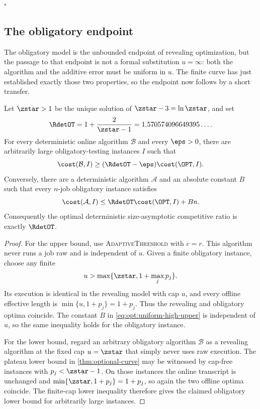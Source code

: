 \hfill$\square$

\subsection{The obligatory endpoint}
\label{sec:obligatory}

The obligatory model is the unbounded endpoint of revealing optimization,
but the passage to that endpoint is not a formal substitution
$u=\infty$: both the algorithm and the additive error must be uniform in
$u$.  The finite curve has just established exactly those two properties,
so the endpoint now follows by a short transfer.

\begin{theorem}
\label{thm:det-obligatory}
Let $\zstar>1$ be the unique solution of
$\zstar-3=\ln \zstar$, and set
\[
 \RdetOT=1+\frac{2}{\zstar-1}
 =1.570574096649395\ldots .
\]
For every deterministic online algorithm $\mathcal B$ and every $\eps>0$,
there are arbitrarily large obligatory-testing instances $I$ such that
\[
 \cost(\mathcal B,I)\ge(\RdetOT-\eps)\cost(\OPT,I).
\]
Conversely, there are a deterministic algorithm $\mathcal A$ and an absolute
constant $B$ such that every $n$-job obligatory instance satisfies
\[
 \cost(\mathcal A,I)\le\RdetOT\cost(\OPT,I)+Bn.
\]
Consequently the optimal deterministic size-asymptotic competitive ratio is
exactly $\RdetOT$.
\end{theorem}

\begin{proof}
For the upper bound, use \textsc{AdaptiveThreshold} with $c=r$.  This
algorithm never runs a job raw and is independent of $u$.  Given a finite
obligatory instance, choose any finite
\[
 u>\max\{\zstar,1+\max_j p_j\}.
\]
Its execution is identical in the revealing model with cap $u$, and every
offline effective length is
$\min\{u,1+p_j\}=1+p_j$.  Thus the revealing and obligatory optima coincide.
The constant $B$ in \cref{eq:opt:uniform-high-upper} is independent of $u$,
so the same inequality holds for the obligatory instance.

For the lower bound, regard an arbitrary obligatory algorithm $\mathcal B$
as a revealing algorithm at the fixed cap $u=\zstar$ that simply never uses raw
execution.  The plateau lower bound in \cref{thm:optional-curve} may be
witnessed by cap-free instances with $p_j<\zstar-1$.  On those instances the
online transcript is unchanged and
$\min\{\zstar,1+p_j\}=1+p_j$, so again the two offline optima coincide.  The
finite-cap lower inequality therefore gives the claimed obligatory lower
bound for arbitrarily large instances.
\end{proof}

